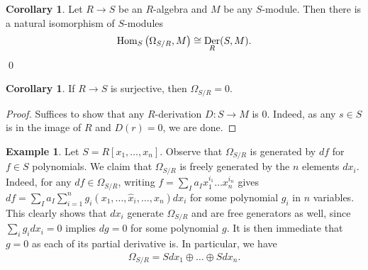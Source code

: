 \documentclass[letterpaper,10pt,twoside]{amsart}
\newcommand{\homset}[3]{{\fontfamily{lmss}\selectfont 
		\text{\rm Hom}_{#1}\left (#2,#3\right )
}}
\newcommand{\isom}{\cong}
\DeclareMathOperator{\Der}{\text{\rm Der}}
\theoremstyle{proposition}
\theoremstyle{definition}
\theoremstyle{theorem}
\theoremstyle{definition}
\theoremstyle{definition}
\theoremstyle{definition}
\theoremstyle{lemma}
\theoremstyle{definition}
\newtheorem{example}[proposition]{\textbf{Example}}
\theoremstyle{definition}
\theoremstyle{corollary}
\newtheorem{corollary}[proposition]{Corollary}
\theoremstyle{definition}
\begin{document}
	\begin{corollary}
		Let $R\to S$ be an $R$-algebra and $M$ be any $S$-module. Then there is a natural isomorphism of $S$-modules
		\begin{align*}
			\homset{S}{\Omega_{S/R}}{M} \isom \Der_{R}(S,M).
		\end{align*}
		\qed
	\end{corollary}
	\begin{corollary}
		If $R\to S$ is surjective, then $\Omega_{S/R} = 0$.
	\end{corollary}
	\begin{proof}
		Suffices to show that any $R$-derivation $D : S\to M$ is 0. Indeed, as any $s\in S$ is in the image of $R$ and $D(r) = 0$, we are done.
	\end{proof}
	\begin{example}\label{E-Polynomials are smooth}
		Let $S = R[x_1,\dots,x_n]$. Observe that $\Omega_{S/R}$ is generated by $df$ for $f\in S$ polynomials. We claim that $\Omega_{S/R}$ is freely generated by the $n$ elements $dx_i$. Indeed, for any $df \in \Omega_{S/R}$, writing $f = \sum_{I}a_Ix_1^{i_1}\dots x_n^{i_n}$ gives $df = \sum_{I}a_I \sum_{i=1}^{n} g_i(x_1,\dots,\hat{x}_i,\dots,x_n) dx_i$ for some polynomial $g_i$ in $n$ variables. This clearly shows that $dx_i$ generate $\Omega_{S/R}$ and are free generators as well, since $\sum_{i}g_idx_i = 0$ implies $dg = 0$ for some polynomial $g$. It is then immediate that $g = 0$ as each of its partial derivative is. In particular, we have
		\begin{align*}
			\Omega_{S/R} = Sdx_1\oplus \dots \oplus Sdx_n.
		\end{align*}
	\end{example}
\end{document}
